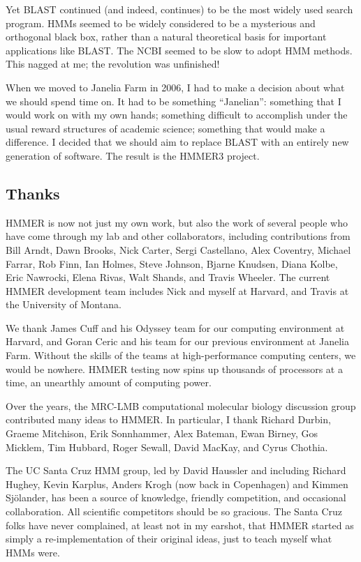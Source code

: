 Yet BLAST continued (and indeed, continues) to be the most widely used
search program.  HMMs seemed to be widely considered to be a
mysterious and orthogonal black box, rather than a natural theoretical
basis for important applications like BLAST. The NCBI seemed to be
slow to adopt HMM methods. This nagged at me; the revolution was
unfinished!

When we moved to Janelia Farm in 2006, I had to make a decision about
what we should spend time on. It had to be something ``Janelian'':
something that I would work on with my own hands; something difficult
to accomplish under the usual reward structures of academic science;
something that would make a difference. I decided that we should aim
to replace BLAST with an entirely new generation of software. The
result is the HMMER3 project.

\subsection{Thanks}

HMMER is now not just my own work, but also the work of several people
who have come through my lab and other collaborators, including
contributions from Bill Arndt, Dawn Brooks, Nick Carter, Sergi
Castellano, Alex Coventry, Michael Farrar, Rob Finn, Ian Holmes, Steve
Johnson, Bjarne Knudsen, Diana Kolbe, Eric Nawrocki, Elena Rivas, Walt
Shands, and Travis Wheeler.  The current HMMER development team
includes Nick and myself at Harvard, and Travis at the University of
Montana.

We thank James Cuff and his Odyssey team for our computing environment
at Harvard, and Goran Ceric and his team for our previous environment
at Janelia Farm.  Without the skills of the teams at high-performance
computing centers, we would be nowhere. HMMER testing now spins up
thousands of processors at a time, an unearthly amount of computing
power.

Over the years, the MRC-LMB computational molecular biology discussion
group contributed many ideas to HMMER. In particular, I thank Richard
Durbin, Graeme Mitchison, Erik Sonnhammer, Alex Bateman, Ewan Birney,
Gos Micklem, Tim Hubbard, Roger Sewall, David MacKay, and Cyrus
Chothia.

The UC Santa Cruz HMM group, led by David Haussler and including
Richard Hughey, Kevin Karplus, Anders Krogh (now back in Copenhagen)
and Kimmen Sj\"{o}lander, has been a source of knowledge, friendly
competition, and occasional collaboration. All scientific competitors
should be so gracious. The Santa Cruz folks have never complained, at
least not in my earshot, that HMMER started as simply a
re-implementation of their original ideas, just to teach myself what
HMMs were.

